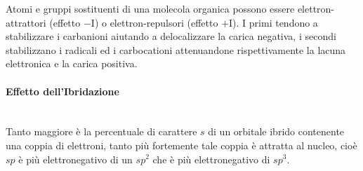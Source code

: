 Atomi e gruppi sostituenti di una molecola organica possono essere elettron-attrattori (effetto $-$I) o elettron-repulsori (effetto $+$I). I primi tendono a stabilizzare i carbanioni aiutando a delocalizzare la carica negativa, i secondi stabilizzano i radicali ed i carbocationi attenuandone rispettivamente la lacuna elettronica e la carica positiva.

\paragraph{Effetto dell'Ibridazione}\mbox{}\\
Tanto maggiore è la percentuale di carattere \(s\) di un orbitale ibrido contenente una coppia di elettroni, tanto più fortemente tale coppia è attratta al nucleo, cioè \(sp\) è più elettronegativo di un \(sp^2\) che è più elettronegativo di \(sp^3\).